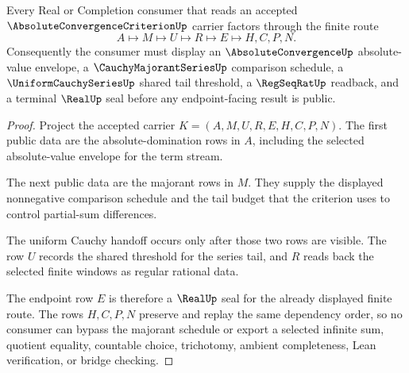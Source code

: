 \begin{theorem}\label{thm:absolute-convergence-criterion-majorant-handoff}
Every Real or Completion consumer that reads an accepted $\AbsoluteConvergenceCriterionUp$ carrier factors through the finite route
$$
A \longmapsto M \longmapsto U \longmapsto R \longmapsto E \longmapsto H,C,P,N .
$$
Consequently the consumer must display an $\AbsoluteConvergenceUp$ absolute-value envelope, a $\CauchyMajorantSeriesUp$ comparison schedule, a $\UniformCauchySeriesUp$ shared tail threshold, a $\RegSeqRatUp$ readback, and a terminal $\RealUp$ seal before any endpoint-facing result is public.
\end{theorem}
\begin{proof}
Project the accepted carrier $K=(A,M,U,R,E,H,C,P,N)$. The first public data are the absolute-domination rows in $A$, including the selected absolute-value envelope for the term stream.

The next public data are the majorant rows in $M$. They supply the displayed nonnegative comparison schedule and the tail budget that the criterion uses to control partial-sum differences.

The uniform Cauchy handoff occurs only after those two rows are visible. The row $U$ records the shared threshold for the series tail, and $R$ reads back the selected finite windows as regular rational data.

The endpoint row $E$ is therefore a $\RealUp$ seal for the already displayed finite route. The rows $H,C,P,N$ preserve and replay the same dependency order, so no consumer can bypass the majorant schedule or export a selected infinite sum, quotient equality, countable choice, trichotomy, ambient completeness, Lean verification, or bridge checking.
\end{proof}



